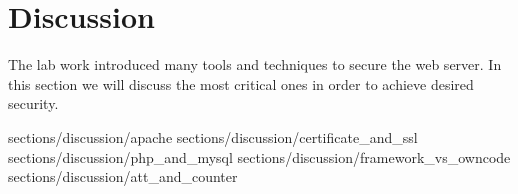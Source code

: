 \section {Discussion}

The lab work introduced many tools and techniques to secure the web server. In this section we will discuss the most critical ones in order to achieve desired security. 


 {sections/discussion/apache}
 {sections/discussion/certificate_and_ssl}
 {sections/discussion/php_and_mysql}
 {sections/discussion/framework_vs_owncode} %
 {sections/discussion/att_and_counter} %

